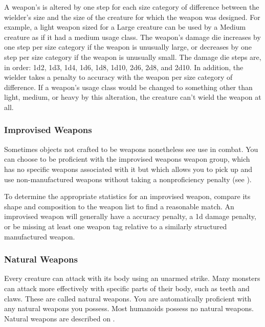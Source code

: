                 \label{Inappropriately Sized Weapons} A weapon's  is altered by one step for each size category of difference between the wielder's size and the size of the creature for which the weapon was designed.
                For example, a light weapon sized for a Large creature can be used by a Medium creature as if it had a medium usage class.
                The weapon's damage die increases by one step per size category if the weapon is unusually large, or decreases by one step per size category if the weapon is unusually small.
                The damage die steps are, in order: 1d2, 1d3, 1d4, 1d6, 1d8, 1d10, 2d6, 2d8, and 2d10.
                In addition, the wielder takes a  penalty to accuracy with the weapon per size category of difference.
                If a weapon's usage class would be changed to something other than light, medium, or heavy by this alteration, the creature can't wield the weapon at all.

        \subsubsection{Improvised Weapons}\label{Improvised Weapons}
            Sometimes objects not crafted to be weapons nonetheless see use in combat.
            You can choose to be proficient with the improvised weapons weapon group, which has no specific weapons associated with it but which allows you to pick up and use non-manufactured weapons without taking a nonproficiency penalty (see ).

            To determine the appropriate statistics for an improvised weapon, compare its shape and composition to the weapon list to find a reasonable match.
            An improvised weapon will generally have a  accuracy penalty, a \minus1d damage penalty, or be missing at least one weapon tag relative to a similarly structured manufactured weapon.

        \subsubsection{Natural Weapons}\label{Natural Weapons}
            Every creature can attack with its body using an unarmed strike. Many monsters can attack more effectively with specific parts of their body, such as teeth and claws. These are called natural weapons. You are automatically proficient with any natural weapons you possess. Most humanoids possess no natural weapons. Natural weapons are described on .


